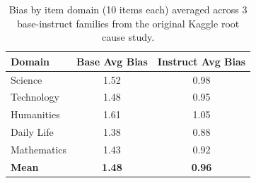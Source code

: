 \begin{table}[h]
\centering\small
\caption{Bias by item domain (10 items each) averaged across 3 base-instruct
families from the original Kaggle root cause study.}
\label{tab:domain}
\begin{tabular}{lcc}
\toprule
\textbf{Domain} & \textbf{Base Avg Bias} & \textbf{Instruct Avg Bias} \\
\midrule
Science & 1.52 & 0.98 \\
Technology & 1.48 & 0.95 \\
Humanities & 1.61 & 1.05 \\
Daily Life & 1.38 & 0.88 \\
Mathematics & 1.43 & 0.92 \\
\midrule
\textbf{Mean} & \textbf{1.48} & \textbf{0.96} \\
\bottomrule
\end{tabular}
\end{table}
